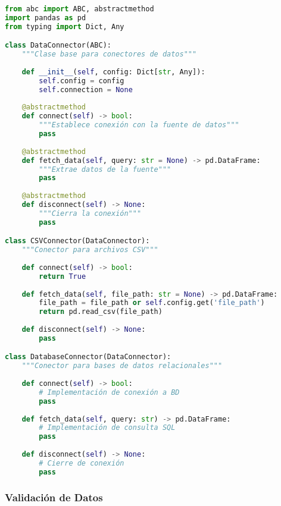 \begin{lstlisting}[language=Python, caption=Conector base para fuentes de datos]
from abc import ABC, abstractmethod
import pandas as pd
from typing import Dict, Any

class DataConnector(ABC):
    """Clase base para conectores de datos"""
    
    def __init__(self, config: Dict[str, Any]):
        self.config = config
        self.connection = None
    
    @abstractmethod
    def connect(self) -> bool:
        """Establece conexión con la fuente de datos"""
        pass
    
    @abstractmethod
    def fetch_data(self, query: str = None) -> pd.DataFrame:
        """Extrae datos de la fuente"""
        pass
    
    @abstractmethod
    def disconnect(self) -> None:
        """Cierra la conexión"""
        pass

class CSVConnector(DataConnector):
    """Conector para archivos CSV"""
    
    def connect(self) -> bool:
        return True
    
    def fetch_data(self, file_path: str = None) -> pd.DataFrame:
        file_path = file_path or self.config.get('file_path')
        return pd.read_csv(file_path)
    
    def disconnect(self) -> None:
        pass

class DatabaseConnector(DataConnector):
    """Conector para bases de datos relacionales"""
    
    def connect(self) -> bool:
        # Implementación de conexión a BD
        pass
    
    def fetch_data(self, query: str) -> pd.DataFrame:
        # Implementación de consulta SQL
        pass
    
    def disconnect(self) -> None:
        # Cierre de conexión
        pass
\end{lstlisting}

\subsubsection{Validación de Datos}

